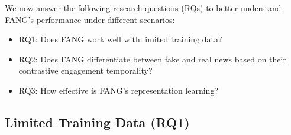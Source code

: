 \documentclass[sigconf]{acmart}
\theoremstyle{definition}
\theoremstyle{hypothesis}
\begin{document}
We now answer the following research questions (RQs) to better understand FANG's performance under different scenarios: 
\begin{itemize}
    \item RQ1: Does FANG work well with limited training data?
    \item RQ2: Does FANG differentiate between fake and real news based on their contrastive engagement temporality?
    \item RQ3: How effective is FANG's representation learning?
\end{itemize}

\subsection{Limited Training Data (RQ1)}
\end{document}
